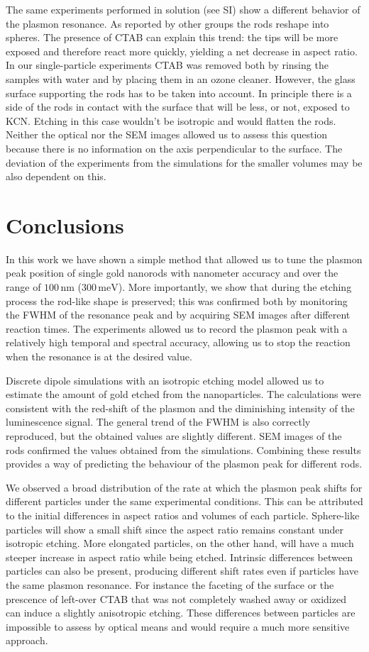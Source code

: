 \documentclass[twoside,twocolumn,11pt]{article}
\newcommand{\nm}{\ensuremath{\,\textrm{nm}}}
\newcommand{\meV}{\ensuremath{\,\textrm{meV}}}
\begin{document}
The same experiments performed in solution (see SI) show a different behavior of
the plasmon resonance. As reported by other groups \cite{Jana2002,Yuan2015} the
rods reshape into spheres. The presence of CTAB can explain this trend: the tips
will be more exposed and therefore react more quickly, yielding a net decrease
in aspect ratio. In our single-particle experiments CTAB was removed both by
rinsing the samples with water and by placing them in an ozone cleaner. However,
the glass surface supporting the rods has to be taken into account. In principle
there is a side of the rods in contact with the surface that will be less, or
not, exposed to KCN. Etching in this case wouldn't be isotropic and would
flatten the rods. Neither the optical nor the SEM images allowed us to assess
this question because there is no information on the axis perpendicular to the
surface. The deviation of the experiments from the simulations for the smaller
volumes may be also dependent on this.

\section{Conclusions}
In this work we have shown a simple method that allowed us to tune the plasmon
peak position of single gold nanorods with nanometer accuracy and over the
range of $100\nm$ ($300\meV$). More importantly, we show that during the
etching process the rod-like shape is preserved; this was confirmed both by
monitoring the FWHM of the resonance peak and by acquiring SEM images after
different reaction times. The experiments allowed us to record the plasmon
peak with a relatively high temporal and spectral accuracy, allowing us to
stop the reaction when the resonance is at the desired value.

Discrete dipole simulations with an isotropic etching model allowed us to
estimate the amount of gold etched from the nanoparticles. The calculations
were consistent with the red-shift of the plasmon and the diminishing intensity
of the luminescence signal. The general trend of the FWHM is also correctly
reproduced, but the obtained values are slightly different. SEM images of the
rods confirmed the values obtained from the simulations. Combining these
results provides a way of predicting the behaviour of the plasmon peak for
different rods.

We observed a broad distribution of the rate at which the plasmon peak shifts
for different particles under the same experimental conditions. This can be
attributed to the initial differences in aspect ratios and volumes of each
particle. Sphere-like particles will show a small shift since the aspect ratio
remains constant under isotropic etching. More elongated particles, on the other
hand, will have a much steeper increase in aspect ratio while being etched.
Intrinsic differences between particles can also be present, producing different
shift rates even if particles have the same plasmon resonance. For instance the
faceting of the surface or the prescence of left-over CTAB that was not
completely washed away or oxidized can induce a slightly anisotropic etching.
These differences between particles are impossible to assess by optical means
and would require a much more sensitive approach.
\end{document}
